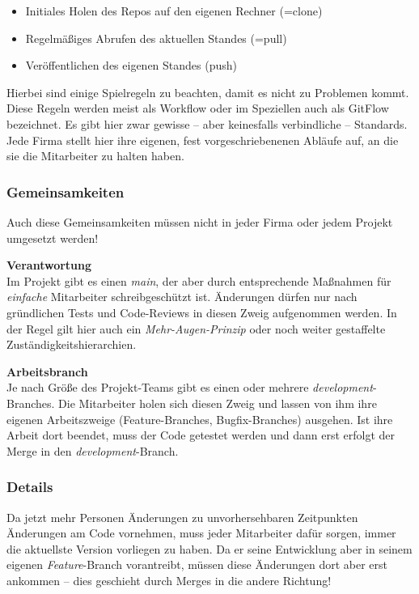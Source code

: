 \documentclass[
  letterpaper,
  DIV=11]{scrreprt}
\providecommand{\tightlist}{%
  \setlength{\itemsep}{0pt}\setlength{\parskip}{0pt}}\usepackage{longtable,booktabs,array}
\newcommand{\branch}[1]{\textit{#1}\xspace}
\begin{document}
\begin{itemize}
\tightlist
\item
  Initiales Holen des Repos auf den eigenen Rechner (=clone)
\item
  Regelmäßiges Abrufen des aktuellen Standes (=pull)
\item
  Veröffentlichen des eigenen Standes (push)
\end{itemize}

Hierbei sind einige Spielregeln zu beachten, damit es nicht zu Problemen
kommt. Diese Regeln werden meist als Workflow oder im Speziellen auch
als GitFlow bezeichnet. Es gibt hier zwar gewisse -- aber keinesfalls
verbindliche -- Standards. Jede Firma stellt hier ihre eigenen, fest
vorgeschriebenenen Abläufe auf, an die sie die Mitarbeiter zu halten
haben.

\subsubsection{Gemeinsamkeiten}\label{gemeinsamkeiten}

Auch diese Gemeinsamkeiten müssen nicht in jeder Firma oder jedem
Projekt umgesetzt werden!

\textbf{Verantwortung}\\
Im Projekt gibt es einen \branch{main}, der aber durch entsprechende
Maßnahmen für \emph{einfache} Mitarbeiter schreibgeschützt ist.
Änderungen dürfen nur nach gründlichen Tests und Code-Reviews in diesen
Zweig aufgenommen werden. In der Regel gilt hier auch ein
\emph{Mehr-Augen-Prinzip} oder noch weiter gestaffelte
Zuständigkeitshierarchien.

\textbf{Arbeitsbranch}\\
Je nach Größe des Projekt-Teams gibt es einen oder mehrere
\branch{development}-Branches. Die Mitarbeiter holen sich diesen Zweig
und lassen von ihm ihre eigenen Arbeitszweige (Feature-Branches,
Bugfix-Branches) ausgehen. Ist ihre Arbeit dort beendet, muss der Code
getestet werden und dann erst erfolgt der Merge in den
\branch{development}-Branch.

\subsubsection{Details}\label{details}

Da jetzt mehr Personen Änderungen zu unvorhersehbaren Zeitpunkten
Änderungen am Code vornehmen, muss jeder Mitarbeiter dafür sorgen, immer
die aktuellste Version vorliegen zu haben. Da er seine Entwicklung aber
in seinem eigenen \branch{Feature}-Branch vorantreibt, müssen diese
Änderungen dort aber erst ankommen -- dies geschieht durch Merges in die
andere Richtung!
\end{document}
